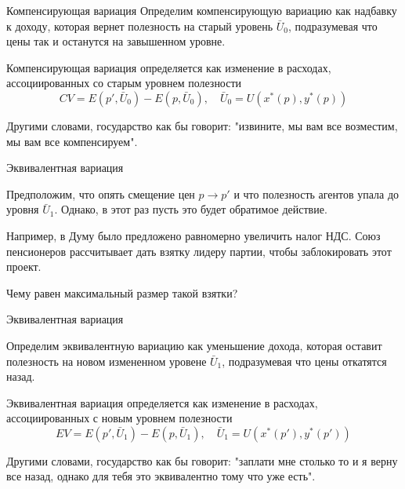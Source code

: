 \documentclass{beamer}
\begin{document}
\begin{frame}{Компенсирующая вариация}
Определим компенсирующую вариацию как надбавку к доходу, которая вернет полезность на старый уровень $\bar U_0$, подразумевая что цены так и останутся на завышенном уровне.

\begin{definition} \alert{Компенсирующая вариация} определяется как изменение в расходах, ассоциированных со старым уровнем полезности
$$CV = E(p',\bar U_0) - E(p,\bar U_0), \quad \bar U_0 = U(x^{\ast}(p), y^{\ast}(p))$$

\end{definition}

Другими словами, государство как бы говорит: "извините, мы вам все возместим, мы вам все \alert{компенсируем}".

\end{frame}

\begin{frame}{Эквивалентная вариация}

Предположим, что опять смещение цен $p \to p'$ и что полезность агентов упала до уровня $\bar U_1$. Однако, в этот раз пусть это будет обратимое действие. 

Например, в Думу было предложено равномерно увеличить налог НДС. Союз пенсионеров рассчитывает дать взятку лидеру партии, чтобы заблокировать этот проект.

Чему равен максимальный размер такой взятки?

\end{frame}

\begin{frame}{Эквивалентная вариация}

Определим эквивалентную вариацию как уменьшение дохода, которая оставит полезность на новом измененном уровене $\bar U_1$, подразумевая что цены откатятся назад.

\begin{definition}

\alert{Эквивалентная вариация} определяется как изменение в расходах, ассоциированных с новым уровнем полезности
$$EV = E(p',\bar U_1) - E(p,\bar U_1), \quad \bar U_1 = U(x^{\ast}(p'), y^{\ast}(p'))$$
\end{definition}

Другими словами, государство как бы говорит: "заплати мне столько то и я верну все назад, однако для тебя это \alert{эквивалентно} тому что уже есть".

\end{frame}
\end{document}
